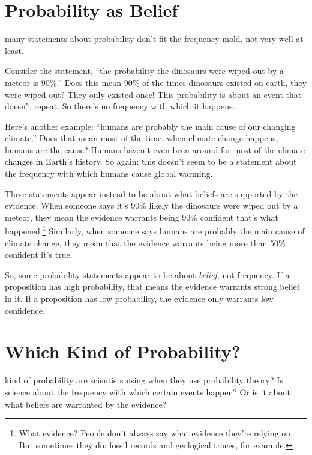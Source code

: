 \documentclass[justified]{tufte-book}
\theoremstyle{definition}
\theoremstyle{definition}
\theoremstyle{definition}
\theoremstyle{remark}
\begin{document}
\hypertarget{probability-as-belief}{%
\section{Probability as Belief}\label{probability-as-belief}}

 many statements about probability don't fit the
frequency mold, not very well at least.

Consider the statement, ``the probability the dinosaurs were wiped out
by a meteor is \(90\%\).'' Does this mean \(90\%\) of the times
dinosaurs existed on earth, they were wiped out? They only existed once!
This probability is about an event that doesn't repeat. So there's no
frequency with which it happens.

Here's another example: ``humans are probably the main cause of our
changing climate.'' Does that mean most of the time, when climate change
happens, humans are the cause? Humans haven't even been around for most
of the climate changes in Earth's history. So again: this doesn't seem
to be a statement about the frequency with which humans cause global
warming.

These statements appear instead to be about what beliefs are supported
by the evidence. When someone says it's \(90\%\) likely the dinosaurs
were wiped out by a meteor, they mean the evidence warrants being
\(90\%\) confident that's what happened.\footnote{What evidence? People
  don't always say what evidence they're relying on. But sometimes they
  do: fossil records and geological traces, for example.} Similarly,
when someone says humans are probably the main cause of climate change,
they mean that the evidence warrants being more than \(50\%\) confident
it's true.

So, some probability statements appear to be about \emph{belief}, not
frequency. If a proposition has high probability, that means the
evidence warrants strong belief in it. If a proposition has low
probability, the evidence only warrants low confidence.

\hypertarget{which-kind-of-probability}{%
\section{Which Kind of Probability?}\label{which-kind-of-probability}}

 kind of probability are scientists using when they
use probability theory? Is science about the frequency with which
certain events happen? Or is it about what beliefs are warranted by the
evidence?
\end{document}

